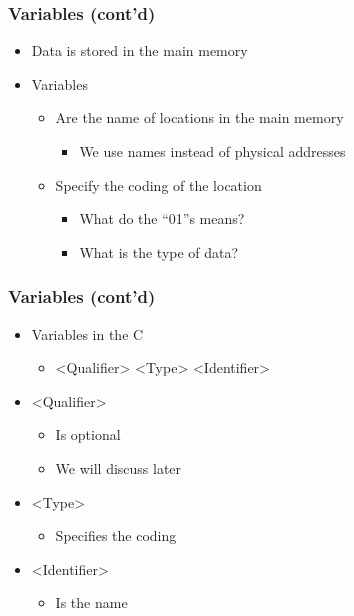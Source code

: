 \documentclass{../c-lecture}
\begin{document}
\begin{frame}
  \frametitle{Variables (cont’d)}
  \begin{itemize}
    \item Data is stored in the main memory
    \item Variables
    \begin{itemize}
      \item Are the {\color{Orange} name} of locations in the main
        memory
      \begin{itemize}
        \item We use names instead of physical addresses
      \end{itemize}
      \item Specify the {\color{Green} coding} of the location
      \begin{itemize}
        \item What do the ``01''s means?
        \item What is the {\color{Cyan} type} of data?
      \end{itemize}
    \end{itemize}
  \end{itemize}
\end{frame}

\begin{frame}
  \frametitle{Variables (cont’d)}
  \begin{itemize}
    \item Variables in the C
    \begin{itemize}
      \item <Qualifier> <Type> <Identifier>
    \end{itemize}
    \item {\color{Orange} <Qualifier>}
    \begin{itemize}
      \item Is optional
      \item We will discuss later
    \end{itemize}
    \item {\color{Green}<Type>}
    \begin{itemize}
      \item Specifies the coding
    \end{itemize}
    \item {\color{Cyan}<Identifier>}
    \begin{itemize}
      \item Is the name
    \end{itemize}
  \end{itemize}
\end{frame}
\end{document}
